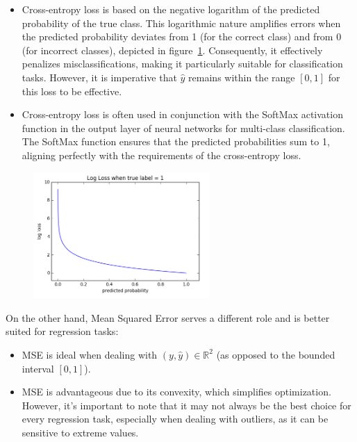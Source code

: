 \begin{itemize}
    \item Cross-entropy loss is based on the negative logarithm of the predicted probability of the true class. This logarithmic nature amplifies errors when the predicted probability deviates from 1 (for the correct class) and from 0 (for incorrect classes), depicted in figure~\ref{fig:CELoss}. Consequently, it effectively penalizes misclassifications, making it particularly suitable for classification tasks. However, it is imperative that $\hat{y}$ remains within the range $[0, 1]$ for this loss to be effective.
    \item Cross-entropy loss is often used in conjunction with the SoftMax activation function in the output layer of neural networks for multi-class classification. The SoftMax function ensures that the predicted probabilities sum to 1, aligning perfectly with the requirements of the cross-entropy loss.
\end{itemize}

\begin{figure}[H]
    \centering
    \includegraphics*[width=0.6\textwidth]{figs/cross_entropy.png}
    \caption{}
    \label{fig:CELoss}
\end{figure}

On the other hand, Mean Squared Error serves a different role and is better suited for regression tasks:

\begin{itemize}
    \item MSE is ideal when dealing with $(y, \hat{y}) \in \mathbb{R}^2$ (as opposed to the bounded interval $[0, 1]$).
    \item MSE is advantageous due to its convexity, which simplifies optimization. However, it's important to note that it may not always be the best choice for every regression task, especially when dealing with outliers, as it can be sensitive to extreme values.
\end{itemize}

